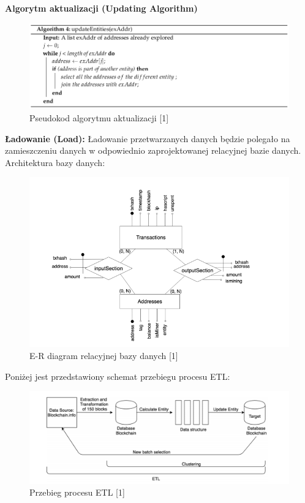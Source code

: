 \documentclass[12pt,oneside,a4paper]{book}
\begin{document}
\textbf{Algorytm aktualizacji (Updating Algorithm)}
\newline
\begin{figure}[H]
    \centering
    \includegraphics[scale=0.65]{UA-alg}
    \caption{Pseudokod algorytmu aktualizacji [1]}
\end{figure}

\newpage

\textbf{Ładowanie (Load):}
\newline
Ładowanie przetwarzanych danych będzie polegało na zamieszczeniu danych w odpowiednio zaprojektowanej relacyjnej bazie danych.
\newline
Architektura bazy danych:
\begin{figure}[H]
    \centering
    \includegraphics[scale=0.8]{BD-architecture}
    \caption{E-R diagram relacyjnej bazy danych [1]}
\end{figure}
Poniżej jest przedstawiony schemat przebiegu procesu ETL:
\begin{figure}[H]
    \centering
    \includegraphics[scale=0.5]{ETL-workflow}
    \caption{Przebieg procesu ETL [1]}
\end{figure}
\end{document}
